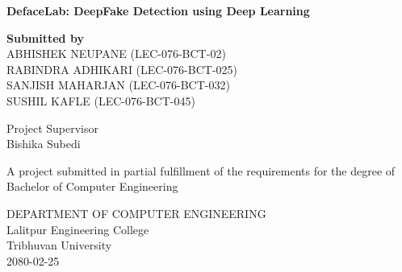 \begin{center}
    \linespread{1.6}
    \thispagestyle{empty}
    \textbf{\large{DefaceLab: DeepFake Detection using Deep Learning}}
    \vspace{2cm}

    \textbf{Submitted by} \\
    ABHISHEK NEUPANE (LEC-076-BCT-02)   \\
    RABINDRA ADHIKARI (LEC-076-BCT-025) \\
    SANJISH MAHARJAN (LEC-076-BCT-032)  \\
    SUSHIL KAFLE (LEC-076-BCT-045)  \\

    \vspace{2cm}

    Project Supervisor\\
    Bishika Subedi \\

    \vspace{2.2cm}

    A project submitted in partial fulfillment of the requirements for the degree of\\
    Bachelor of Computer Engineering

    \vspace{2.2cm}

    DEPARTMENT OF COMPUTER ENGINEERING \\
    Lalitpur Engineering College\\
    Tribhuvan University\\
    \vspace{1cm}
    2080-02-25

\end{center}
